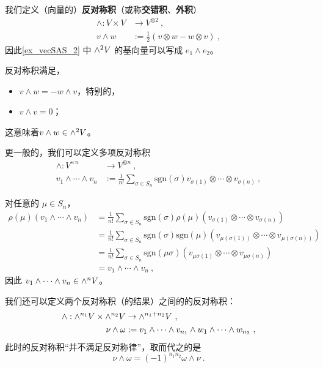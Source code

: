我们定义（向量的）\textbf{反对称积}（或称\textbf{交错积}、\textbf{外积}）
\begin{equation}
\begin{aligned}
\wedge: V \times V &\to V^{\otimes 2}~, \\
v \wedge w &:= \frac12 (v \otimes w - w \otimes v)~,
\end{aligned}
\end{equation}
因此\autoref{ex_vecSAS_2} 中 ${\large \wedge}^2 V$ 的基向量可以写成 $e_1 \wedge e_2$。

反对称积满足，
\begin{itemize}
\item $v \wedge w = - w \wedge v$，特别的，
\item $v \wedge v = 0$；
\end{itemize}
这意味着$v \wedge w \in {\large \wedge}^2 V$。

更一般的，我们可以定义多项反对称积
\begin{equation}
\begin{aligned}
\wedge: V^{\times n} &\to V^{\otimes n}~, \\
v_1 \wedge \cdots \wedge v_n &:= \frac{1}{n!} \sum_{\sigma \in S_n} \text{sgn}(\sigma) v_{\sigma(1)} \otimes \cdots \otimes v_{\sigma(n)}~,
\end{aligned}
\end{equation}

对任意的 $\mu \in S_n$，
\begin{equation}
\begin{aligned}
\rho(\mu)(v_1 \wedge \cdots \wedge v_n) &= \frac{1}{n!} \sum_{\sigma \in S_n} \text{sgn}(\sigma) \rho(\mu)(v_{\sigma(1)} \otimes \cdots \otimes v_{\sigma(n)}) \\
&= \frac{1}{n!} \sum_{\sigma \in S_n} \text{sgn}(\sigma) \text{sgn}(\mu) (v_{\mu(\sigma(1))} \otimes \cdots \otimes v_{\mu(\sigma(n))}) \\
&= \frac{1}{n!} \sum_{\sigma \in S_n} \text{sgn}(\mu \sigma) (v_{\mu \sigma(1)} \otimes \cdots \otimes v_{\mu \sigma(n)}) \\
&= v_1 \wedge \cdots \wedge v_n~,
\end{aligned}
\end{equation}
因此 $v_1 \wedge \cdots \wedge v_n \in {\large \wedge}^n V$。

我们还可以定义两个反对称积（的结果）之间的的反对称积：
\begin{equation}
\begin{aligned}
\wedge: {\large \wedge}^{n_1} V \times {\large \wedge}^{n_2} V &\to {\large \wedge}^{n_1 + n_2} V~, \\
\nu \wedge \omega &:= v_1 \wedge \cdots \wedge v_{n_1} \wedge w_1 \wedge \cdots \wedge w_{n_2}~,
\end{aligned}
\end{equation}
此时的反对称积“并不满足反对称律”，取而代之的是
\begin{equation}
\nu \wedge \omega = (-1)^{n_1 n_2} \omega \wedge \nu~.
\end{equation}

